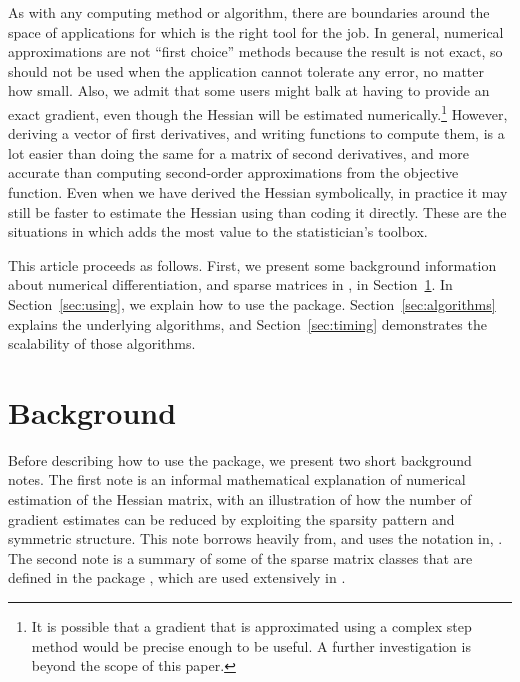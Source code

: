 \documentclass[jss]{jss}\usepackage[]{graphicx}\usepackage[]{color}
\begin{document}
As with any computing method or algorithm, there are boundaries around
the space of applications for which  is the right
tool for the job. In general, numerical approximations are not ``first
choice'' methods because the result is not exact, so
 should not be used when the application cannot
tolerate any error, no matter how small.  Also, we admit that some
users might balk at having to provide an exact gradient, even though
the Hessian will be estimated numerically.\footnote{It is possible
  that a gradient that is approximated using a complex step method
  would be precise enough to be useful. A further investigation is
  beyond the scope of this paper.} However, deriving a vector of first
derivatives, and writing  functions to compute them, is a
lot easier than doing the same for a matrix of second derivatives, and
more accurate than computing second-order approximations from the
objective function. Even when we have derived the Hessian
symbolically, in practice it may still be faster to estimate the Hessian
using  than coding it directly.  These are the
situations in which  adds the most value to the
statistician's toolbox.

This article proceeds as follows.  First, we present
some background information about numerical differentiation, and
sparse matrices in , in Section~\ref{sec:background}.  In
Section~\ref{sec:using}, we explain how to use the package.
Section~\ref{sec:algorithms} explains the underlying algorithms, and
Section~\ref{sec:timing} demonstrates the scalability of those algorithms.


\section[Background]{Background}\label{sec:background}

Before describing how to use the package, we
present two short background notes.  The first note is an informal
mathematical explanation of numerical estimation of the Hessian
matrix, with an illustration of how the number of gradient estimates
can be reduced by exploiting the sparsity pattern and symmetric
structure.  This note borrows heavily from, and uses the notation in,
\citet[Chapter 6]{MagnusNeudecker2007}. The
second note is a summary of some of the sparse matrix classes that are
defined in the  package \citep{R_Matrix}, which are used
extensively in .
\end{document}

